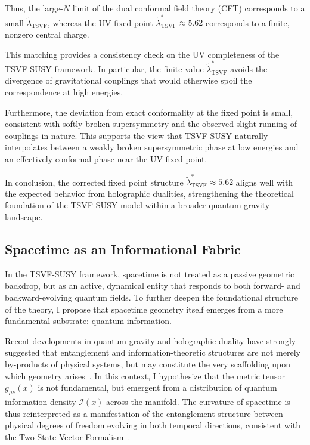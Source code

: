 \documentclass[twocolumn,superscriptaddress,floatfix]{revtex4-2}
\begin{document}
Thus, the large-\(N\) limit of the dual conformal field theory (CFT) corresponds to a small \(\tilde{\lambda}_{\text{TSVF}}\), whereas the UV fixed point \(\tilde{\lambda}_{\text{TSVF}}^* \approx 5.62\) corresponds to a finite, nonzero central charge.

This matching provides a consistency check on the UV completeness of the TSVF-SUSY framework. In particular, the finite value \(\tilde{\lambda}_{\text{TSVF}}^*\) avoids the divergence of gravitational couplings that would otherwise spoil the correspondence at high energies.

Furthermore, the deviation from exact conformality at the fixed point is small, consistent with softly broken supersymmetry and the observed slight running of couplings in nature. This supports the view that TSVF-SUSY naturally interpolates between a weakly broken supersymmetric phase at low energies and an effectively conformal phase near the UV fixed point.

In conclusion, the corrected fixed point structure \(\tilde{\lambda}_{\text{TSVF}}^* \approx 5.62\) aligns well with the expected behavior from holographic dualities, strengthening the theoretical foundation of the TSVF-SUSY model within a broader quantum gravity landscape.

\subsection{Spacetime as an Informational Fabric}
\label{subsec:infofabric}

In the TSVF-SUSY framework, spacetime is not treated as a passive geometric backdrop, but as an active, dynamical entity that responds to both forward- and backward-evolving quantum fields. To further deepen the foundational structure of the theory, I propose that spacetime geometry itself emerges from a more fundamental substrate: quantum information.

Recent developments in quantum gravity and holographic duality have strongly suggested that entanglement and information-theoretic structures are not merely by-products of physical systems, but may constitute the very scaffolding upon which geometry arises~\cite{VanRaamsdonk2010, Susskind2016, Swingle2012}. In this context, I hypothesize that the metric tensor \(g_{\mu\nu}(x)\) is not fundamental, but emergent from a distribution of quantum information density \(\mathcal{I}(x)\) across the manifold. The curvature of spacetime is thus reinterpreted as a manifestation of the entanglement structure between physical degrees of freedom evolving in both temporal directions, consistent with the Two-State Vector Formalism~\cite{Aharonov2008, Vaidman2016}.
\end{document}
